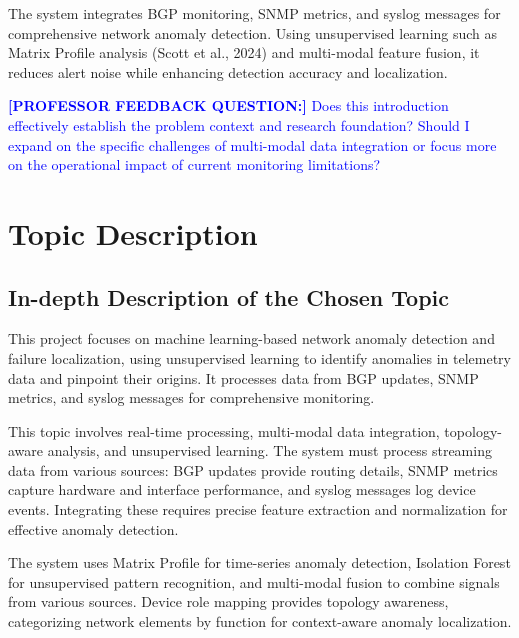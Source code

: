 \documentclass[11pt]{article}
\begin{document}
The system integrates BGP monitoring, SNMP metrics, and syslog messages for comprehensive network anomaly detection. Using unsupervised learning such as Matrix Profile analysis (Scott et al., 2024) and multi-modal feature fusion, it reduces alert noise while enhancing detection accuracy and localization.

\textcolor{blue}{\textbf{[PROFESSOR FEEDBACK QUESTION:]} Does this introduction effectively establish the problem context and research foundation? Should I expand on the specific challenges of multi-modal data integration or focus more on the operational impact of current monitoring limitations?}

\section{Topic Description}

\subsection{In-depth Description of the Chosen Topic}

This project focuses on machine learning-based network anomaly detection and failure localization, using unsupervised learning to identify anomalies in telemetry data and pinpoint their origins. It processes data from BGP updates, SNMP metrics, and syslog messages for comprehensive monitoring.

This topic involves real-time processing, multi-modal data integration, topology-aware analysis, and unsupervised learning. The system must process streaming data from various sources: BGP updates provide routing details, SNMP metrics capture hardware and interface performance, and syslog messages log device events. Integrating these requires precise feature extraction and normalization for effective anomaly detection.

The system uses Matrix Profile for time-series anomaly detection, Isolation Forest for unsupervised pattern recognition, and multi-modal fusion to combine signals from various sources. Device role mapping provides topology awareness, categorizing network elements by function for context-aware anomaly localization.
\end{document}
